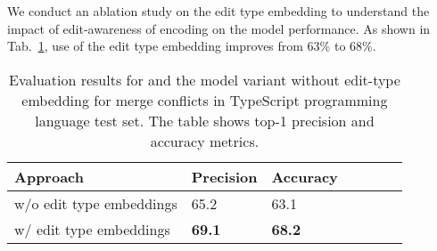 We conduct an ablation study on the edit type embedding to understand the impact of edit-awareness of encoding on the model performance. As shown in Tab.~\ref{tab:edit_ablation}, use of the edit type embedding improves  \thistool{} from 63\% to 68\%.
\begin{table}[htb]
\small
\caption{Evaluation results for \thistool{} and the model variant without edit-type embedding for merge conflicts in TypeScript programming language test set. The table shows top-1 precision and accuracy metrics.}
\centering
\begin{tabular}{lllllll} \toprule
\textbf{Approach} & \textbf{Precision} & \textbf{Accuracy}   \\ 
\midrule
w/o edit type embeddings  & 65.2 & 63.1  \\
\thistool{} w/ edit type embeddings & \textbf{69.1} & \textbf{68.2}  \\ 
\bottomrule
\end{tabular}
\label{tab:edit_ablation}
\end{table}

